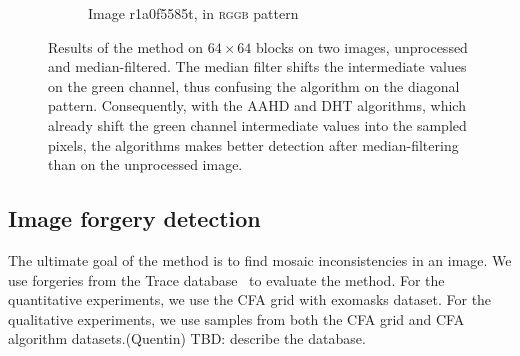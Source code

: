 \documentclass{ipol}
\newcommand{\qb}[1]{\textcolor{c1}{(Quentin) #1}}
\begin{document}
\begin{figure}[ht]
\begin{subfigure}[t]{\linewidth}
\begin{tabular}{ccccccccc}
                \bottomrule
        \end{tabular}
        \caption{Image r1a0f5585t, in \textsc{rggb} pattern}
\end{subfigure}
\caption{Results of the method on $64\times64$ blocks on two images, unprocessed and median-filtered. The median filter shifts the intermediate values on the green channel, thus confusing the algorithm on the diagonal pattern. Consequently, with the AAHD and DHT algorithms, which already shift the green channel intermediate values into the sampled pixels, the algorithms makes better detection after median-filtering than on the unprocessed image.}
\label{fig:median}
\end{figure}

\clearpage
\subsection{Image forgery detection}
The ultimate goal of the method is to find mosaic inconsistencies in an image. We use forgeries from the Trace database~\cite{trace} to evaluate the method. For the quantitative experiments, we use the CFA grid with exomasks dataset. For the qualitative experiments, we use samples from both the CFA grid and CFA algorithm datasets.\qb{TBD: describe the database.}
\end{document}
